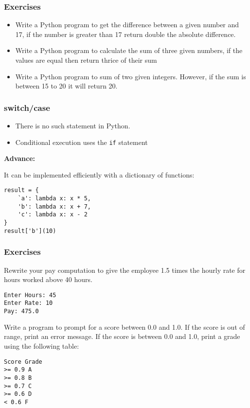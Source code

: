\begin{frame}[fragile]\frametitle{Exercises}
\begin{itemize}
\item Write a Python program to get the difference between a given number and 17, if the number is greater than 17 return double the absolute difference.
\item Write a Python program to calculate the sum of three given numbers, if the values are equal then return thrice of their sum
\item Write a Python program to sum of two given integers. However, if the sum is between 15 to 20 it will return 20.
\end{itemize}
\end{frame}



\begin{frame}[fragile]\frametitle{switch/case}
  \begin{itemize}
\item There is no such statement in Python.
\item Conditional execution uses the \texttt{if} statement
\end{itemize}

\textbf{Advance:}

   It can be implemented efficiently with a dictionary of functions:
\begin{lstlisting}
result = {
	`a': lambda x: x * 5,
	'b': lambda x: x + 7,
	'c': lambda x: x - 2
}
result['b'](10)
\end{lstlisting}

\end{frame}

\begin{frame}[fragile]\frametitle{Exercises}
Rewrite your pay computation to give the employee 1.5 times the
hourly rate for hours worked above 40 hours.
\begin{lstlisting}
Enter Hours: 45
Enter Rate: 10
Pay: 475.0
\end{lstlisting}
Write a program to prompt for a score between 0.0 and 1.0. If the
score is out of range, print an error message. If the score is between 0.0 and 1.0,
print a grade using the following table:
\begin{lstlisting}
Score Grade
>= 0.9 A
>= 0.8 B
>= 0.7 C
>= 0.6 D
< 0.6 F
\end{lstlisting}

\end{frame}



